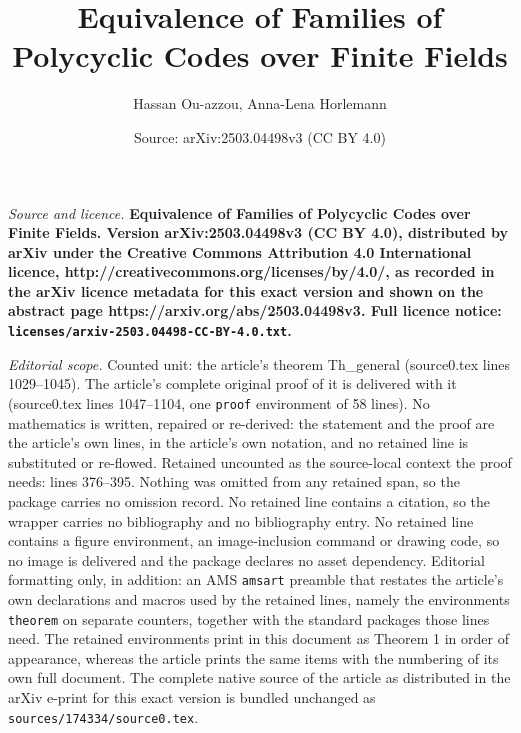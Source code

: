 \documentclass[10pt,a4paper]{amsart}
\title{\LARGE \bfseries Equivalence of Families of Polycyclic Codes over Finite Fields}
\author{Hassan Ou-azzou, Anna-Lena Horlemann}
\date{Source: arXiv:2503.04498v3 (CC BY 4.0)}
\begin{document}
\maketitle

\noindent\emph{Source and licence.} \LARGE \bfseries Equivalence of Families of Polycyclic Codes over Finite Fields. Version arXiv:2503.04498v3 (CC BY 4.0), distributed by arXiv under the Creative Commons Attribution 4.0 International licence, http://creativecommons.org/licenses/by/4.0/, as recorded in the arXiv licence metadata for this exact version and shown on the abstract page https://arxiv.org/abs/2503.04498v3. Full licence notice: \texttt{licenses/arxiv-2503.04498-CC-BY-4.0.txt}.\par\smallskip

\noindent\textit{Editorial scope.} Counted unit: the article's theorem Th\_general (source0.tex lines 1029--1045). The article's complete original proof of it is delivered with it (source0.tex lines 1047--1104, one \texttt{proof} environment of 58 lines). No mathematics is written, repaired or re-derived: the statement and the proof are the article's own lines, in the article's own notation, and no retained line is substituted or re-flowed.  Retained uncounted as the source-local context the proof needs: lines 376--395.  Nothing was omitted from any retained span, so the package carries no omission record.  No retained line contains a citation, so the wrapper carries no bibliography and no bibliography entry.  No retained line contains a figure environment, an image-inclusion command or drawing code, so no image is delivered and the package declares no asset dependency.  Editorial formatting only, in addition: an AMS \texttt{amsart} preamble that restates the article's own declarations and macros used by the retained lines, namely the environments \texttt{theorem} on separate counters, together with the standard packages those lines need.  The retained environments print in this document as Theorem 1 in order of appearance, whereas the article prints the same items with the numbering of its own full document.  The complete native source of the article as distributed in the arXiv e-print for this exact version is bundled unchanged as \texttt{sources/174334/source0.tex}.
\end{document}
